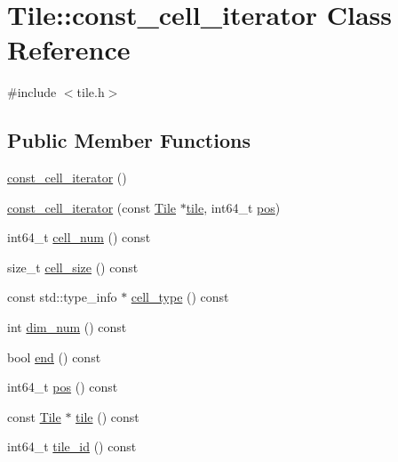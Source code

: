 \hypertarget{classTile_1_1const__cell__iterator}{}\section{Tile\+:\+:const\+\_\+cell\+\_\+iterator Class Reference}
\label{classTile_1_1const__cell__iterator}


{\ttfamily \#include $<$tile.\+h$>$}

\subsection*{Public Member Functions}
\begin{DoxyCompactItemize}
\item 
\hyperlink{classTile_1_1const__cell__iterator_ae9dd39bf179a77a9c03e33d7c674a3ca}{const\+\_\+cell\+\_\+iterator} ()
\item 
\hyperlink{classTile_1_1const__cell__iterator_a6f097166099c169153797ad92502602a}{const\+\_\+cell\+\_\+iterator} (const \hyperlink{classTile}{Tile} $\ast$\hyperlink{classTile_1_1const__cell__iterator_ab1d2bed3a3d0ddea0bb992a13e36bd19}{tile}, int64\+\_\+t \hyperlink{classTile_1_1const__cell__iterator_abbe541375b84ec14720c5e4b5fde34d0}{pos})
\item 
int64\+\_\+t \hyperlink{classTile_1_1const__cell__iterator_a2504e5f7879cd324d1b7eb21cee2c644}{cell\+\_\+num} () const 
\item 
size\+\_\+t \hyperlink{classTile_1_1const__cell__iterator_affa7e84a0e22199819fde53b2d3e45ed}{cell\+\_\+size} () const 
\item 
const std\+::type\+\_\+info $\ast$ \hyperlink{classTile_1_1const__cell__iterator_ad8d4b3f1ba489dffccc0c8f0052ec0ea}{cell\+\_\+type} () const 
\item 
int \hyperlink{classTile_1_1const__cell__iterator_a00a7a8915d31c493bb8a57a63ca1783d}{dim\+\_\+num} () const 
\item 
bool \hyperlink{classTile_1_1const__cell__iterator_a03ff84b5132ecdce417735d94063fcef}{end} () const 
\item 
int64\+\_\+t \hyperlink{classTile_1_1const__cell__iterator_abbe541375b84ec14720c5e4b5fde34d0}{pos} () const 
\item 
const \hyperlink{classTile}{Tile} $\ast$ \hyperlink{classTile_1_1const__cell__iterator_ab1d2bed3a3d0ddea0bb992a13e36bd19}{tile} () const 
\item 
int64\+\_\+t \hyperlink{classTile_1_1const__cell__iterator_adea9e3bb6d4629ccaafa7874687886d0}{tile\+\_\+id} () const 

\end{DoxyCompactItemize}
